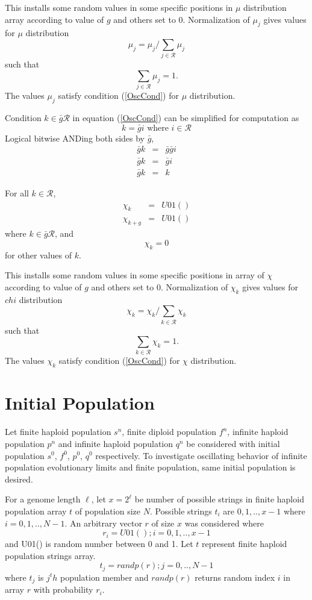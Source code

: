 This installs some random values in some specific positions in $\mu$ distribution array according to value of $g$ and others set to $0$. 
Normalization of $\mu_j$ gives values for $\mu$ distribution
\[
\mu_j = \mu_j / \sum \limits_{j \in \mathcal{R} } \mu_j
\]
such that 
\[
\sum \limits_{j \in \mathcal{R} } \mu_j = 1.
\]
The values $\mu_j$ satisfy condition (\ref{OscCond}) for $\mu$ distribution.


Condition $k \in \bar{g} \mathcal{R}$ in equation (\ref{OscCond}) can be simplified for computation as
\[
k = \bar{g} i  \text{ where $i \in \mathcal{R}$}
\]
Logical bitwise ANDing both sides by $\bar{g}$,
\begin{eqnarray*}
\bar{g} k & = & \bar{g} \bar{g} i \\
\bar{g} k & = & \bar{g} i \\
\bar{g} k & = & k 
\end{eqnarray*}

For all $k \in \mathcal{R}$,
\begin{eqnarray*}
\chi_k & = & U01() \\
\chi_{k+g} & = & U01() 
\end{eqnarray*}
where $k \in \bar{g} \mathcal{R}$, and
\[
\chi_k = 0
\]
for other values of $k$. \newline

This installs some random values in some specific positions in array of $\chi$ according to value of $g$ and others set to $0$. Normalization of $\chi_k$ gives values for $chi$ distribution 
\[
\chi_k = \chi_k/\sum\limits_{k \in \mathcal{R}} \chi_k
\]
such that 
\[
\sum\limits_{k \in \mathcal{R}} \chi_k = 1.
\]
The values $\chi_k$ satisfy condition (\ref{OscCond}) for $\chi$ distribution.

\section{Initial Population}
\label{InitPopOsc}
Let finite haploid population $s^n$, finite diploid population $f^n$, infinite haploid population $p^n$ and infinite haploid population $q^n$ be considered with initial population $s^0$, $f^0$,
$p^0$, $q^0$ respectively. To investigate oscillating behavior of infinite population evolutionary limits and finite population, same initial population is desired. 

For a genome length $\ell$, let $x = 2^\ell$ be number of possible strings in finite haploid population array $t$ of population size $N$. Possible strings $t_i$ are ${0, 1,.., x-1}$ where $i = 0, 1,.., N-1$. An arbitrary vector $r$ of size $x$ was considered where
\[
r_i = U01(); {i = 0, 1,.., x-1}
\]
and U01() is random number between 0 and 1.
Let $t$ represent finite haploid population strings array.
\[
t_j = randp(r) ; {j = 0,.., N-1}
\]
where $t_j$ is $j^th$ population member and $randp(r)$ returns random index $i$ in array $r$ with probability $r_i$.

